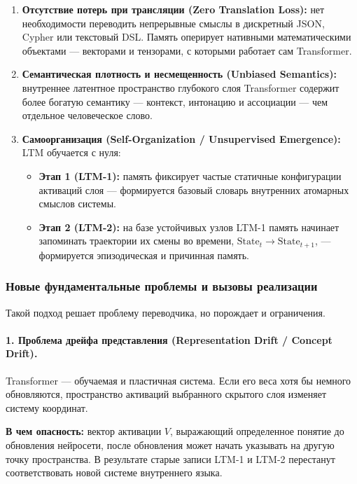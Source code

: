 \documentclass[11pt,a4paper]{article}
\begin{document}
\begin{enumerate}
    \item \textbf{Отсутствие потерь при трансляции (Zero Translation Loss):} нет необходимости переводить непрерывные смыслы в дискретный JSON, Cypher или текстовый DSL. Память оперирует нативными математическими объектами — векторами и тензорами, с которыми работает сам Transformer.
    \item \textbf{Семантическая плотность и несмещенность (Unbiased Semantics):} внутреннее латентное пространство глубокого слоя Transformer содержит более богатую семантику — контекст, интонацию и ассоциации — чем отдельное человеческое слово.
    \item \textbf{Самоорганизация (Self-Organization / Unsupervised Emergence):} LTM обучается с нуля:
    \begin{itemize}
        \item \textbf{Этап 1 (LTM-1):} память фиксирует частые статичные конфигурации активаций слоя — формируется базовый словарь внутренних атомарных смыслов системы.
        \item \textbf{Этап 2 (LTM-2):} на базе устойчивых узлов LTM-1 память начинает запоминать траектории их смены во времени, $\mathrm{State}_t \rightarrow \mathrm{State}_{t+1}$, — формируется эпизодическая и причинная память.
    \end{itemize}
\end{enumerate}

\subsubsection*{Новые фундаментальные проблемы и вызовы реализации}

Такой подход решает проблему переводчика, но порождает и ограничения.

\paragraph{1. Проблема дрейфа представления (Representation Drift / Concept Drift).}
Transformer — обучаемая и пластичная система. Если его веса хотя бы немного обновляются, пространство активаций выбранного скрытого слоя изменяет систему координат.

\textbf{В чем опасность:} вектор активации $V$, выражающий определенное понятие до обновления нейросети, после обновления может начать указывать на другую точку пространства. В результате старые записи LTM-1 и LTM-2 перестанут соответствовать новой системе внутреннего языка.
\end{document}
